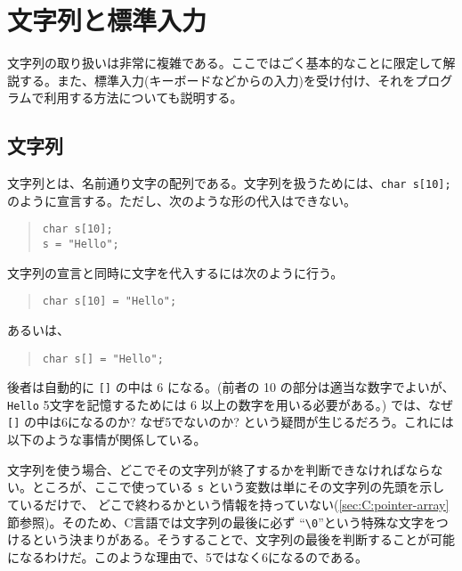 \section{文字列と標準入力}
文字列の取り扱いは非常に複雑である。ここではごく基本的なことに限定して解説する。また、標準入力(キーボードなどからの入力)を受け付け、それをプログラムで利用する方法についても説明する。

\subsection{文字列}
文字列とは、名前通り文字の配列である。文字列を扱うためには、\texttt{char s[10];} のように宣言する。ただし、次のような形の代入はできない。
\begin{quote}
    \begin{verbatim}
char s[10];
s = "Hello";
\end{verbatim}
\end{quote}
文字列の宣言と同時に文字を代入するには次のように行う。
\begin{quote}
    \begin{verbatim}
char s[10] = "Hello";
\end{verbatim}
\end{quote}
あるいは、
\begin{quote}
    \begin{verbatim}
char s[] = "Hello";
\end{verbatim}
\end{quote}
後者は自動的に \texttt{[]} の中は 6 になる。(前者の 10 の部分は適当な数字でよいが、\texttt{Hello} 5文字を記憶するためには 6 以上の数字を用いる必要がある。) では、なぜ \texttt{[]} の中は6になるのか? なぜ5でないのか? という疑問が生じるだろう。これには以下のような事情が関係している。

文字列を使う場合、どこでその文字列が終了するかを判断できなければならない。ところが、ここで使っている \texttt{s} という変数は単にその文字列の先頭を示しているだけで、
どこで終わるかという情報を持っていない(\ref{sec:C:pointer-array}節参照)。そのため、C言語では文字列の最後に必ず ``\texttt{\textbackslash 0}''という特殊な文字をつけるという決まりがある。そうすることで、文字列の最後を判断することが可能になるわけだ。このような理由で、5ではなく6になるのである。
\begin{figure}[H]
    \centering
\end{figure}

